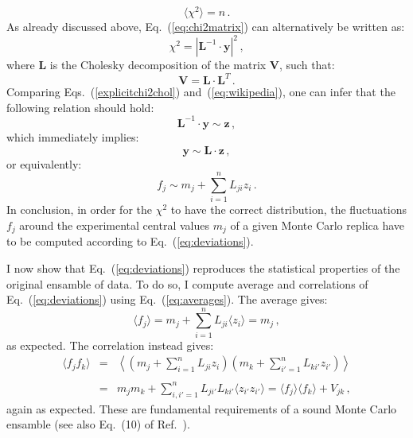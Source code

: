 \documentclass[10pt,a4paper]{article}
\begin{document}
\begin{equation}
\langle\chi^2\rangle=n\,.
\end{equation}
As already discussed above, Eq.~(\ref{eq:chi2matrix}) can
alternatively be written as:
\begin{equation}\label{explicitchi2chol}
\chi^2 = \left|\mathbf{L}^{-1}\cdot \mathbf{y}\right|^2\,,
\end{equation}
where $\mathbf{L}$ is the Cholesky decomposition of the matrix
$\mathbf{V}$, such that:
\begin{equation}\label{eq:choleskydecagain}
\mathbf{V} = \mathbf{L}\cdot\mathbf{L}^{T}\,.
\end{equation}
Comparing Eqs.~(\ref{explicitchi2chol}) and~(\ref{eq:wikipedia}), one
can infer that the following relation should hold:
\begin{equation}
\mathbf{L}^{-1}\cdot \mathbf{y}\sim\mathbf{z}\,,
\end{equation}
which immediately implies:
\begin{equation}
\mathbf{y}\sim\mathbf{L}\cdot\mathbf{z}\,,
\end{equation}
or equivalently:
\begin{equation}\label{eq:deviations}
f_j\sim m_j+\sum_{i=1}^nL_{ji}z_i\,.
\end{equation}
In conclusion, in order for the $\chi^2$ to have the correct
distribution, the fluctuations $f_j$ around the experimental central
values $m_j$ of a given Monte Carlo replica have to be computed
according to Eq.~(\ref{eq:deviations}).

I now show that Eq.~(\ref{eq:deviations}) reproduces the statistical
properties of the original ensamble of data. To do so, I compute
average and correlations of Eq.~(\ref{eq:deviations}) using
Eq.~(\ref{eq:averages}). The average gives:
\begin{equation}
\langle f_j\rangle = m_j+\sum_{i=1}^nL_{ji}\langle z_i \rangle = m_j\,,
\end{equation}
as expected. The correlation instead gives:
\begin{equation}
\begin{array}{rcl}
\langle f_j f_k\rangle &=& \displaystyle \left\langle
  \left(m_j+\sum_{i=1}^nL_{ji}z_i\right)
  \left(m_k+\sum_{i'=1}^nL_{ki'}z_{i'}\right)\right\rangle\\
\\
&=& \displaystyle m_jm_k+\sum_{i,i'=1}^nL_{ji'}L_{ki'}\langle z_{i'}
    z_{i'}\rangle=\langle f_j \rangle\langle f_k\rangle+V_{jk}\,,
\end{array}
\end{equation}
again as expected. These are fundamental requirements of a sound Monte
Carlo ensamble (see also Eq.~(10) of Ref.~\cite{Ball:2009qv}).
\end{document}
